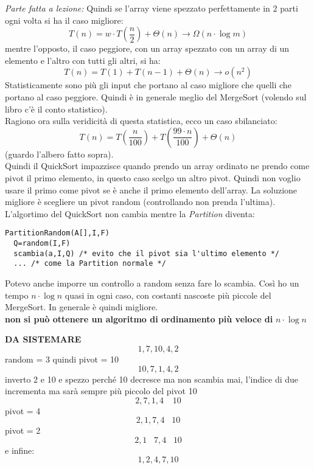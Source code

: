 \documentclass[a4paper,12pt,oneside,tikz]{book}
\begin{document}
\textit{Parte fatta a lezione:}
Quindi se l'array viene spezzato perfettamente in 2 parti ogni volta si ha il caso migliore:
$$T(n)=w\cdot T\left(\frac{n}{2}\right)+\Theta(n)\rightarrow \Omega(n\cdot \log m)$$
mentre l'opposto, il caso peggiore, con un array spezzato con un array di un elemento e l'altro con tutti gli altri, si ha:
$$T(n)=T(1)+T(n-1)+\Theta(n)\rightarrow o(n^2)$$
Statisticamente sono più gli input che portano al caso migliore che quelli che portano al caso peggiore. Quindi è in generale meglio del MergeSort (volendo sul libro c'è il conto statistico).\\
Ragiono ora sulla veridicità di questa statistica, ecco un caso sbilanciato:
$$T(n)=T\left(\frac{n}{100}\right)+T\left(\frac{99\cdot n}{100}\right)+\Theta(n)$$ (guardo l'albero fatto sopra).\\
Quindi il QuickSort impazzisce quando prendo un array ordinato ne prendo come pivot il primo elemento, in questo caso scelgo un altro pivot. Quindi non voglio usare il primo come pivot se è anche il primo elemento dell'array. La soluzione migliore è scegliere un pivot random (controllando non prenda l'ultima). L'algortimo del QuickSort non cambia mentre la \textit{Partition} diventa:
\begin{verbatim}
PartitionRandom(A[],I,F)
  Q=random(I,F)
  scambia(a,I,Q) /* evito che il pivot sia l'ultimo elemento */
  ... /* come la Partition normale */
\end{verbatim}
Potevo anche imporre un controllo a random senza fare lo scambia.
Così ho un tempo $n\cdot\log n$ quasi in ogni caso, con costanti nascoste più piccole del MergeSort. In generale è quindi migliore.\\
\textbf{non si può ottenere un algoritmo di ordinamento più veloce di} $n\cdot\log n$
\begin{esempio}
\textbf{DA SISTEMARE}
$$1,7,10,4,2$$
random = 3 quindi pivot = 10
$$10,7,1,4,2$$
inverto 2 e 10 e spezzo perché 10 decresce ma non scambia mai, l'indice di due incrementa ma sarà sempre più piccolo del pivot 10
$$2,7,1,4\,\,\,\,\,\ 10$$
pivot = 4
$$2,1,7,4\,\,\,\,\,10$$
pivot = 2
$$2,1\,\,\,\,\,7,4\,\,\,\,\,10$$
e infine:
$$1,2,4,7,10$$
\end{esempio}
\newpage
\end{document}
